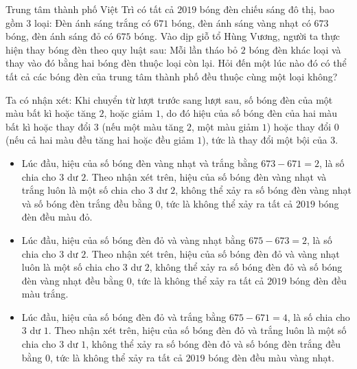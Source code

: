\begin{ex}%
Trung tâm thành phố Việt Trì có tất cả $2019$ bóng đèn chiếu sáng đô thị, bao gồm $3$ loại:  Đèn ánh sáng trắng có $671$ bóng, đèn ánh sáng vàng nhạt có $673$ bóng, đèn ánh sáng đỏ có $675$ bóng. Vào dịp giỗ tổ Hùng Vương, người ta thực hiện thay bóng đèn theo quy luật sau: Mỗi lần tháo bỏ $2$ bóng đèn khác loại và thay vào đó bằng hai bóng đèn thuộc loại còn lại. Hỏi đến một lúc nào đó có thể tất cả các bóng đèn của trung tâm thành phố đều thuộc cùng một loại không?
\loigiai
    {
Ta có nhận xét: Khi chuyển từ lượt trước sang lượt sau, số bóng đèn của một màu bất kì hoặc tăng $2$, hoặc giảm $1$, do đó hiệu của số bóng đèn của hai màu bất kì hoặc thay đổi $3$ (nếu một màu tăng $2$, một màu giảm $1$) hoặc thay đổi $0$ (nếu cả hai màu đều tăng hai hoặc đều giảm $1$), tức là thay đổi một bội của $3$.
\begin{itemize}
\item Lúc đầu, hiệu của số bóng đèn vàng nhạt và trắng bằng $673-671=2$, là số chia cho $3$ dư $2$. Theo nhận xét trên, hiệu của số bóng đèn vàng nhạt và trắng luôn là một số chia cho $3$ dư $2$, không thể xảy ra số bóng đèn vàng nhạt và số bóng đèn trắng đều bằng $0$, tức là không thể xảy ra tất cả $2019$ bóng đèn đều màu đỏ.
\item Lúc đầu, hiệu của số bóng đèn đỏ và vàng nhạt bằng $675-673=2$, là số chia cho $3$ dư $2$. Theo nhận xét trên, hiệu của số bóng đèn đỏ và vàng nhạt luôn là một số chia cho $3$ dư $2$, không thể xảy ra số bóng đèn đỏ và số bóng đèn vàng nhạt đều bằng $0$, tức là không thể xảy ra tất cả $2019$ bóng đèn đều màu trắng.
\item Lúc đầu, hiệu của số bóng đèn đỏ và trắng bằng $675-671=4$, là số chia cho $3$ dư $1$. Theo nhận xét trên, hiệu của số bóng đèn đỏ và trắng luôn là một số chia cho $3$ dư $1$, không thể xảy ra số bóng đèn đỏ và số bóng đèn trắng đều bằng $0$, tức là không thể xảy ra tất cả $2019$ bóng đèn đều màu vàng nhạt.
\end{itemize}
    }
\end{ex}


